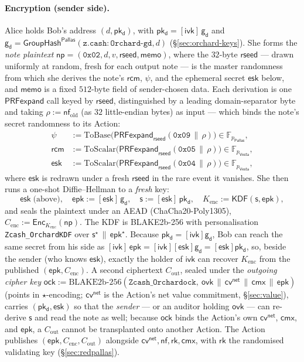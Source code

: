 \documentclass[11pt,a4paper]{article}
\theoremstyle{definition}
\newcommand{\F}{\mathbb{F}}
\newcommand{\nfsym}{\mathsf{nf}}
\newcommand{\cmx}{\mathsf{cmx}}
\newcommand{\cvsym}{\mathsf{cv}}
\newcommand{\rk}{\mathsf{rk}}
\newcommand{\Pallas}{\ensuremath{\mathsf{Pallas}}}
\newcommand{\Vesta}{\ensuremath{\mathsf{Vesta}}}
\newcommand{\GroupHash}{\ensuremath{\mathsf{GroupHash}}}
\newcommand{\ivk}{\ensuremath{\mathsf{ivk}}}
\newcommand{\ovk}{\ensuremath{\mathsf{ovk}}}
\newcommand{\pkd}{\ensuremath{\mathsf{pk_d}}}
\newcommand{\gd}{\ensuremath{\mathsf{g_d}}}
\newcommand{\rcm}{\ensuremath{\mathsf{rcm}}}
\begin{document}
\paragraph{Encryption (sender side).} Alice holds Bob's address $(d, \pkd)$,
with $\pkd = [\ivk]\,\gd$ and $\gd = \GroupHash^{\Pallas}(\mathtt{z.cash:Orchard\text{-}gd}, d)$
(\S\ref{sec:orchard-keys}). She forms the \emph{note plaintext}
$\mathsf{np} = (\mathtt{0x02}, d, v, \mathsf{rseed}, \mathsf{memo})$, where the
$32$-byte $\mathsf{rseed}$ --- drawn uniformly at random, fresh for each output
note --- is the master randomness from which she derives the
note's $\rcm$, $\psi$, and the ephemeral secret $\mathsf{esk}$ below, and
$\mathsf{memo}$ is a fixed $512$-byte field of sender-chosen data. Each
derivation is one $\mathsf{PRFexpand}$ call keyed by $\mathsf{rseed}$,
distinguished by a leading domain-separator byte and taking
$\rho := \nfsym_{\mathrm{old}}$ (as $32$ little-endian bytes) as input ---
which binds the note's secret randomness to its Action:
\begin{align*}
\psi   &:= \mathrm{ToBase}\bigl(\mathsf{PRFexpand}_{\mathsf{rseed}}(\mathtt{0x09} \,\|\, \rho)\bigr) \in \F_{p_{\Pallas}}, \\
\rcm   &:= \mathrm{ToScalar}\bigl(\mathsf{PRFexpand}_{\mathsf{rseed}}(\mathtt{0x05} \,\|\, \rho)\bigr) \in \F_{p_{\Vesta}}, \\
\mathsf{esk} &:= \mathrm{ToScalar}\bigl(\mathsf{PRFexpand}_{\mathsf{rseed}}(\mathtt{0x04} \,\|\, \rho)\bigr) \in \F_{p_{\Vesta}},
\end{align*}
where $\mathsf{esk}$ is redrawn under a fresh $\mathsf{rseed}$ in the rare event
it vanishes. She then runs a one-shot
Diffie--Hellman to a \emph{fresh} key:
\[
\mathsf{esk} \;\text{(above)}, \quad
\mathsf{epk} := [\mathsf{esk}]\,\gd, \quad
\mathsf{s} := [\mathsf{esk}]\,\pkd, \quad
K_{\mathrm{enc}} := \mathsf{KDF}(\mathsf{s}, \mathsf{epk}),
\]
and seals the plaintext under an AEAD (ChaCha20-Poly1305),
$C_{\mathrm{enc}} := \mathsf{Enc}_{K_{\mathrm{enc}}}(\mathsf{np})$. The KDF is
BLAKE2b-256 with personalisation \texttt{Zcash\_OrchardKDF} over
$\mathsf{s}^\star \,\|\, \mathsf{epk}^\star$. Because
$\pkd = [\ivk]\gd$, Bob can reach the same secret from his side as
$[\ivk]\,\mathsf{epk} = [\ivk][\mathsf{esk}]\gd = [\mathsf{esk}]\pkd$, so,
beside the sender (who knows $\mathsf{esk}$), exactly the holder of $\ivk$
can recover $K_{\mathrm{enc}}$ from the published
$(\mathsf{epk}, C_{\mathrm{enc}})$. A second ciphertext
$C_{\mathrm{out}}$, sealed under the \emph{outgoing cipher key}
$\mathsf{ock} := \mathrm{BLAKE2b\text{-}256}(\texttt{Zcash\_Orchardock},\
\ovk \,\|\, \cvsym^{\mathsf{net}} \,\|\, \cmx \,\|\, \mathsf{epk})$ (points in
$\star$-encoding; $\cvsym^{\mathsf{net}}$ is the Action's net value
commitment, \S\ref{sec:value}), carries
$(\pkd, \mathsf{esk})$ so that the \emph{sender} --- or an auditor holding $\ovk$
--- can re-derive $\mathsf{s}$ and read the note as well; because $\mathsf{ock}$
binds the Action's own $\cvsym^{\mathsf{net}}$, $\cmx$, and $\mathsf{epk}$, a $C_{\mathrm{out}}$
cannot be transplanted onto another Action. The Action publishes
$(\mathsf{epk}, C_{\mathrm{enc}}, C_{\mathrm{out}})$ alongside
$\cvsym^{\mathsf{net}}, \nfsym, \rk, \cmx$, with $\rk$ the randomised
validating key (\S\ref{sec:redpallas}).
\end{document}
